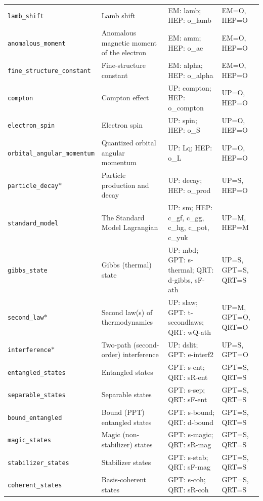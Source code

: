 \begin{longtable}{@{}p{3.1cm}p{3.6cm}p{5.0cm}p{2.9cm}@{}}
\texttt{lamb\_\allowbreak{{}}shift} & Lamb shift & EM: lamb; HEP: o\_lamb & EM=O, HEP=O \\
\texttt{anomalous\_\allowbreak{{}}moment} & Anomalous magnetic moment of the electron & EM: amm; HEP: o\_ae & EM=O, HEP=O \\
\texttt{fine\_\allowbreak{{}}structure\_\allowbreak{{}}constant} & Fine-structure constant & EM: alpha; HEP: o\_alpha & EM=O, HEP=O \\
\texttt{compton} & Compton effect & UP: compton; HEP: o\_compton & UP=O, HEP=O \\
\texttt{electron\_\allowbreak{{}}spin} & Electron spin & UP: spin; HEP: o\_S & UP=O, HEP=O \\
\texttt{orbital\_\allowbreak{{}}angular\_\allowbreak{{}}momentum} & Quantized orbital angular momentum & UP: Lq; HEP: o\_L & UP=O, HEP=O \\
\texttt{particle\_\allowbreak{{}}decay}$\ast$ & Particle production and decay & UP: decay; HEP: o\_prod & UP=S, HEP=O \\
\texttt{standard\_\allowbreak{{}}model} & The Standard Model Lagrangian & UP: sm; HEP: c\_gf, c\_gg, c\_hg, c\_pot, c\_yuk & UP=M, HEP=M \\
\texttt{gibbs\_\allowbreak{{}}state} & Gibbs (thermal) state & UP: mbd; GPT: s-thermal; QRT: d-gibbs, sF-ath & UP=S, GPT=S, QRT=S \\
\texttt{second\_\allowbreak{{}}law}$\ast$ & Second law(s) of thermodynamics & UP: slaw; GPT: t-secondlaws; QRT: wQ-ath & UP=M, GPT=O, QRT=O \\
\texttt{interference}$\ast$ & Two-path (second-order) interference & UP: dslit; GPT: e-interf2 & UP=S, GPT=O \\
\texttt{entangled\_\allowbreak{{}}states} & Entangled states & GPT: s-ent; QRT: sR-ent & GPT=S, QRT=S \\
\texttt{separable\_\allowbreak{{}}states} & Separable states & GPT: s-sep; QRT: sF-ent & GPT=S, QRT=S \\
\texttt{bound\_\allowbreak{{}}entangled} & Bound (PPT) entangled states & GPT: s-bound; QRT: d-bound & GPT=S, QRT=S \\
\texttt{magic\_\allowbreak{{}}states} & Magic (non-stabilizer) states & GPT: s-magic; QRT: sR-mag & GPT=S, QRT=S \\
\texttt{stabilizer\_\allowbreak{{}}states} & Stabilizer states & GPT: s-stab; QRT: sF-mag & GPT=S, QRT=S \\
\texttt{coherent\_\allowbreak{{}}states} & Basis-coherent states & GPT: s-coh; QRT: sR-coh & GPT=S, QRT=S \\

\end{longtable}
